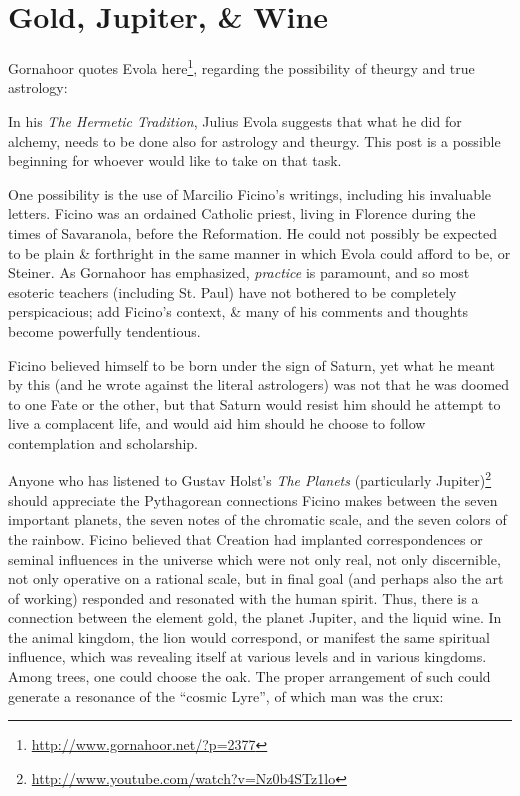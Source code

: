 \section{Gold, Jupiter, \& Wine}

Gornahoor quotes Evola here\footnote{\url{http://www.gornahoor.net/?p=2377}}, regarding the possibility of theurgy and true astrology:

\begin{quotex}
In his \emph{The Hermetic Tradition}, Julius Evola suggests that what he did for alchemy, needs to be done also for astrology and theurgy. This post is a possible beginning for whoever would like to take on that task.
\end{quotex}


One possibility is the use of Marcilio Ficino's writings, including his invaluable letters. Ficino was an ordained Catholic priest, living in Florence during the times of Savaranola, before the Reformation. He could not possibly be expected to be plain \& forthright in the same manner in which Evola could afford to be, or Steiner. As Gornahoor has emphasized, \emph{practice} is paramount, and so most esoteric teachers (including St. Paul) have not bothered to be completely perspicacious; add Ficino's context, \& many of his comments and thoughts become powerfully tendentious.

Ficino believed himself to be born under the sign of Saturn, yet what he meant by this (and he wrote against the literal astrologers) was not that he was doomed to one Fate or the other, but that Saturn would resist him should he attempt to live a complacent life, and would aid him should he choose to follow contemplation and scholarship.

Anyone who has listened to Gustav Holst's \emph{The Planets} (particularly Jupiter)\footnote{\url{http://www.youtube.com/watch?v=Nz0b4STz1lo}} should appreciate the Pythagorean connections Ficino makes between the seven important planets, the seven notes of the chromatic scale, and the seven colors of the rainbow. Ficino believed that Creation had implanted correspondences or seminal influences in the universe which were not only real, not only discernible, not only operative on a rational scale, but in final goal (and perhaps also the art of working) responded and resonated with the human spirit. Thus, there is a connection between the element gold, the planet Jupiter, and the liquid wine. In the animal kingdom, the lion would correspond, or manifest the same spiritual influence, which was revealing itself at various levels and in various kingdoms. Among trees, one could choose the oak. The proper arrangement of such could generate a resonance of the ``cosmic Lyre'', of which man was the crux:

